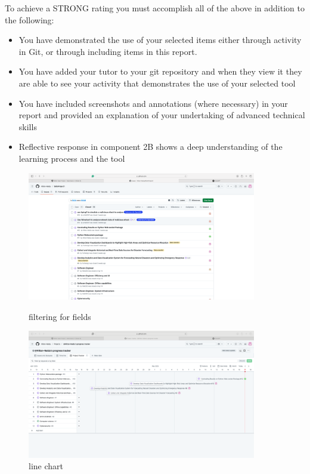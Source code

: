 \documentclass[a4paper, 11pt]{report}
\begin{document}
To achieve a STRONG rating you must accomplish all of the above in addition to the following:
\begin{itemize}
    \item You have demonstrated the use of your selected items either through activity in Git, or through including items in this report.
    \item You have added your tutor to your git repository and when they view it they are able to see your activity that demonstrates the use of your selected tool
    \item You have included screenshots and annotations (where necessary) in your report and provided an explanation of your undertaking of advanced technical skills
    \item Reflective response in component 2B shows a deep understanding of the learning process and the tool
\end{itemize}

\vspace{4ex}


\begin{figure}[htbp]
\centering
\begin{minipage}[t]{1.5\textwidth}
\centering
\includegraphics[width=10cm]{Field filter.png}
\caption{filtering for fields}
\end{minipage}
\begin{minipage}[t]{1.5\textwidth}
\centering
\includegraphics[width=10cm]{Tracker.png}
\caption{line chart}
\end{minipage}
\end{figure}
\end{document}
